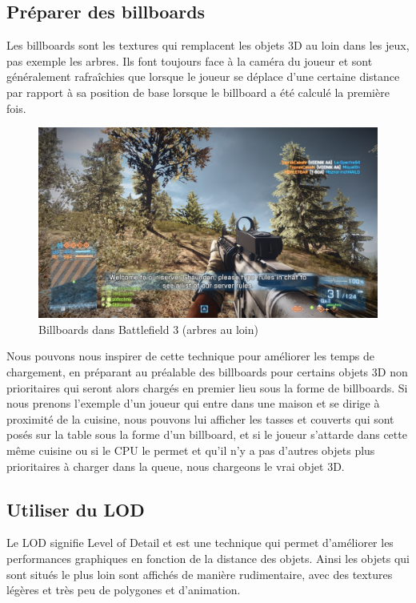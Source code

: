 \documentclass[a4paper, 12pt]{article} %
\begin{document}
\newpage
\subsection{Préparer des billboards}
Les billboards sont les textures qui remplacent les objets 3D au loin dans les jeux, pas exemple les arbres. Ils font toujours face à la caméra du joueur et sont généralement rafraîchies que lorsque le joueur se déplace d'une certaine distance par rapport à sa position de base lorsque le billboard a été calculé la première fois. 

\begin{figure}[!h]%
\includegraphics[width=\columnwidth]{images/bf3_billboards.png}%
\caption{Billboards dans Battlefield 3 (arbres au loin)}%
\label{}%
\end{figure}

Nous pouvons nous inspirer de cette technique pour améliorer les temps de chargement, en préparant au préalable des billboards pour certains objets 3D non prioritaires qui seront alors chargés en premier lieu sous la forme de billboards. Si nous prenons l'exemple d'un joueur qui entre dans une maison et se dirige à proximité de la cuisine, nous pouvons lui afficher les tasses et couverts qui sont posés sur la table sous la forme d'un billboard, et si le joueur s'attarde dans cette même cuisine ou si le CPU le permet et qu'il n'y a pas d'autres objets plus prioritaires à charger dans la queue, nous chargeons le vrai objet 3D.


\newpage
\subsection{Utiliser du LOD}
Le LOD signifie Level of Detail et est une technique qui permet d'améliorer les performances graphiques en fonction de la distance des objets. Ainsi les objets qui sont situés le plus loin sont affichés de manière rudimentaire, avec des textures légères et très peu de polygones et d'animation.
\end{document}
